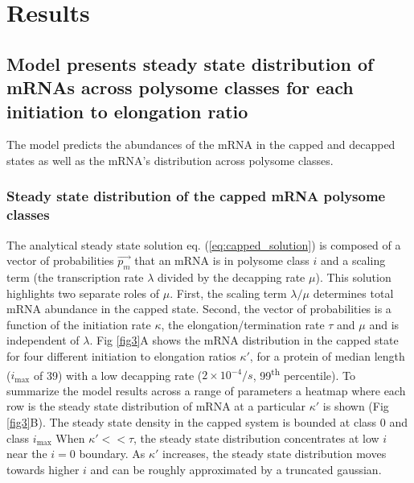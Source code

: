 \documentclass[10pt,letterpaper]{article}
\newcommand{\imax}{\ensuremath{{i_{\max}}}\xspace}
\begin{document}
\section*{Results}

\subsection*{Model presents steady state distribution of mRNAs across polysome classes for each initiation to elongation ratio}

The model predicts the abundances of the mRNA in the capped and decapped states as well as the mRNA's distribution across polysome classes.

\subsubsection*{Steady state distribution of the capped mRNA polysome classes}

The analytical steady state solution eq. (\ref{eq:capped_solution}) is composed of a vector of probabilities $\vec{p_m}$ that an mRNA is in polysome class $i$ and a scaling term (the transcription rate $\lambda$ divided by the decapping rate $\mu$). 
This solution highlights two separate roles of $\mu$. 
First, the scaling term $\lambda / \mu$ determines total mRNA abundance in the capped state. 
Second, the vector of probabilities is a function of the initiation rate $\kappa$, the elongation/termination rate $\tau$ and $\mu$ and is independent of $\lambda$.
Fig \ref{fig3}A shows the mRNA distribution in the capped state for four different initiation to elongation ratios $\kappa'$, for a protein of median length (\imax of 39) with a low decapping rate ($2\times10^{-4} /s$, 99\textsuperscript{th} percentile).
To summarize the model results across a range of parameters a heatmap where each row is the steady state distribution of mRNA at a particular $\kappa'$ is shown (Fig \ref{fig3}B).
The steady state density in the capped system is bounded at class 0 and class \imax 
When $\kappa'<<\tau$, the steady state distribution concentrates at low $i$ near the $i=0$ boundary.
As $\kappa'$ increases, the steady state distribution moves towards higher $i$ and can be roughly approximated by a truncated gaussian. 
\end{document}
